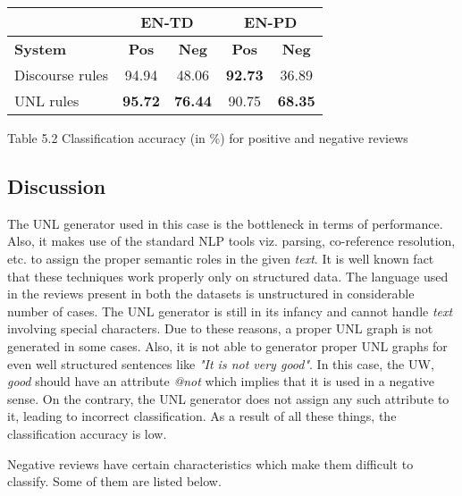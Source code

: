 \begin{center}
  \begin{tabular}[h]{l|c|c|c|c|}
   \cline{2-5}
    & \multicolumn{2}{|c|}{\textbf{EN-TD}} & \multicolumn{2}{|c|}{\textbf{EN-PD}} \\ \hline
    \textbf{System} & \textbf{Pos} & \textbf{Neg} & \textbf{Pos} & \textbf{Neg} \\ \hline \hline
    Discourse rules & 94.94 & 48.06 & \textbf{92.73} & 36.89 \\ \hline
    UNL rules & \textbf{95.72} & \textbf{76.44} & 90.75 & \textbf{68.35} \\ \hline
   \hline
  \end{tabular}
\end{center} 
\begin{center}
 Table 5.2 Classification accuracy (in \%) for positive and negative reviews
\end{center}

\subsection{Discussion}

The UNL generator used in this case is the bottleneck in terms of performance. Also, it makes use of the standard NLP tools viz. parsing, co-reference resolution, etc. 
to assign the proper semantic roles in the given \textit{text}. It is well known fact that these techniques work properly only on structured data. The language used in 
the reviews present in both the datasets is unstructured in considerable number of cases. The UNL generator is still in its infancy and cannot handle \textit{text} 
involving special characters. Due to these reasons, a proper UNL graph is not generated in some cases. Also, it is not able to generator proper UNL graphs for even well 
structured sentences like \textit{"It is not very good"}. In this case, the UW,  \textit{good} should have an attribute \textit{@not} which implies that it is used in 
a negative sense. On the contrary, the UNL generator does not assign any such attribute to it, leading to incorrect classification. As a result of all these things, the 
classification accuracy is low.

Negative reviews have certain characteristics which make them difficult to classify. Some of them are listed below.

